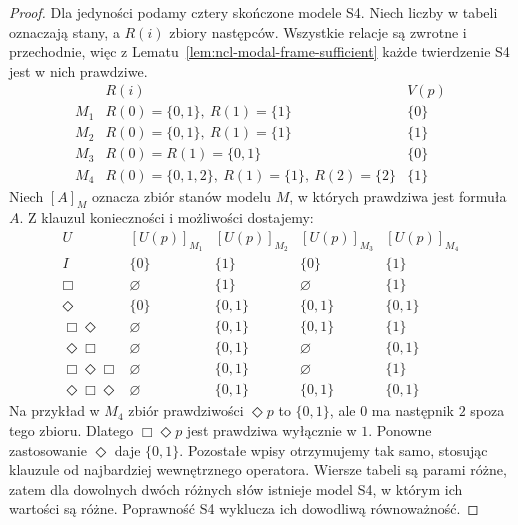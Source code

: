 \begin{proof}
Dla jedyności podamy cztery skończone modele S4.
Niech liczby w tabeli oznaczają stany, a $R(i)$
zbiory następców. Wszystkie relacje są zwrotne
i przechodnie, więc z
Lematu~\ref{lem:ncl-modal-frame-sufficient}
każde twierdzenie S4 jest w nich prawdziwe.
\[
\begin{array}{c|l|c}
 &R(i)&V(p)\\ \hline
 M_1&R(0)=\{0,1\},\ R(1)=\{1\}&\{0\}\\
 M_2&R(0)=\{0,1\},\ R(1)=\{1\}&\{1\}\\
 M_3&R(0)=R(1)=\{0,1\}&\{0\}\\
 M_4&R(0)=\{0,1,2\},\
 R(1)=\{1\},\ R(2)=\{2\}&\{1\}
\end{array}
\]
Niech $[A]_M$ oznacza zbiór stanów modelu $M$,
w których prawdziwa jest formuła $A$.
Z klauzul konieczności i możliwości dostajemy:
\[
\begin{array}{c|cccc}
 U &[U(p)]_{M_1}&[U(p)]_{M_2}&[U(p)]_{M_3}&[U(p)]_{M_4}\\ \hline
 I&\{0\}&\{1\}&\{0\}&\{1\}\\
 \Box&\varnothing&\{1\}&\varnothing&\{1\}\\
 \Diamond&\{0\}&\{0,1\}&\{0,1\}&\{0,1\}\\
 \Box\Diamond&\varnothing&\{0,1\}&\{0,1\}&\{1\}\\
 \Diamond\Box&\varnothing&\{0,1\}&\varnothing&\{0,1\}\\
 \Box\Diamond\Box&\varnothing&\{0,1\}&\varnothing&\{1\}\\
 \Diamond\Box\Diamond&\varnothing&\{0,1\}&\{0,1\}&\{0,1\}
\end{array}
\]
Na przykład w $M_4$ zbiór prawdziwości
$\Diamond p$ to $\{0,1\}$, ale $0$ ma
następnik $2$ spoza tego zbioru.
Dlatego $\Box\Diamond p$ jest prawdziwa
wyłącznie w $1$. Ponowne zastosowanie
$\Diamond$ daje $\{0,1\}$.
Pozostałe wpisy otrzymujemy tak samo, stosując
klauzule od najbardziej wewnętrznego operatora.
Wiersze tabeli są parami różne, zatem dla
dowolnych dwóch różnych słów istnieje model
S4, w którym ich wartości są różne.
Poprawność S4 wyklucza ich dowodliwą równoważność.
\end{proof}

